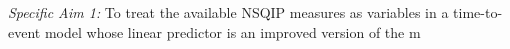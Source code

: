 \emph{Specific Aim 1:} To treat the available NSQIP measures as variables in a time-to-event model whose linear predictor is an improved version of the m
